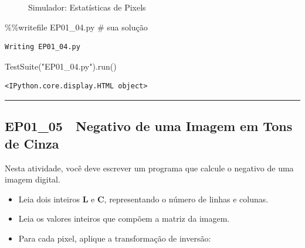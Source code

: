 \documentclass[
  portuguese,
  letterpaper,
  openany,
  oneside,
  12pt,
  a4paper]{book}
\newenvironment{Shaded}{\begin{snugshade}}{\end{snugshade}}
\newcommand{\CommentTok}[1]{\textcolor[rgb]{0.37,0.37,0.37}{#1}}
\newcommand{\NormalTok}[1]{\textcolor[rgb]{0.00,0.23,0.31}{#1}}
\newcommand{\OperatorTok}[1]{\textcolor[rgb]{0.37,0.37,0.37}{#1}}
\newcommand{\StringTok}[1]{\textcolor[rgb]{0.13,0.47,0.30}{#1}}
\providecommand{\tightlist}{%
  \setlength{\itemsep}{0pt}\setlength{\parskip}{0pt}}
\begin{document}
\begin{figure}


\caption{\label{fig-01-estatisticas-pixels}Simulador: Estatísticas de
Pixels}

\end{figure}%

\begin{Shaded}
\begin{Highlighting}[]
\OperatorTok{\%\%}\NormalTok{writefile EP01\_04.py}
\CommentTok{\# sua solução}
\end{Highlighting}
\end{Shaded}

\begin{verbatim}
Writing EP01_04.py
\end{verbatim}

\begin{Shaded}
\begin{Highlighting}[]
\NormalTok{TestSuite(}\StringTok{"EP01\_04.py"}\NormalTok{).run()}
\end{Highlighting}
\end{Shaded}

\begin{verbatim}
<IPython.core.display.HTML object>
\end{verbatim}

\begin{center}\rule{0.5\linewidth}{0.5pt}\end{center}

\subsection{EP01\_05 🔄 Negativo de uma Imagem em Tons de
Cinza}\label{ep01_05-negativo-de-uma-imagem-em-tons-de-cinza}

Nesta atividade, você deve escrever um programa que calcule o negativo
de uma imagem digital.

\begin{itemize}
\tightlist
\item
  Leia dois inteiros \textbf{L} e \textbf{C}, representando o número de
  linhas e colunas.
\item
  Leia os valores inteiros que compõem a matriz da imagem.
\item
  Para cada pixel, aplique a transformação de inversão:
\end{itemize}
\end{document}
